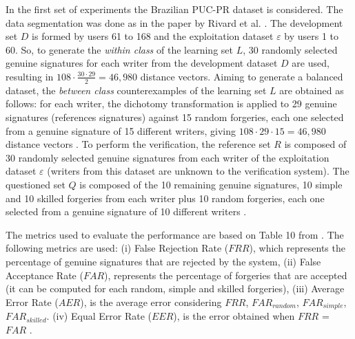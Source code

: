 \documentclass[conference]{IEEEtran}
\begin{document}
In the first set of experiments the Brazilian PUC-PR dataset is considered. The data segmentation was done as in the paper by Rivard et al. \cite{rivard:13}. The development set $D$ is formed by users 61 to 168 and the exploitation dataset $\varepsilon$ by users 1 to 60.
So, to generate the \textit{within class} of the learning set $L$, 30 randomly selected genuine signatures for each writer from the development dataset $D$ are used, resulting in $108 \cdot \frac{30 \cdot 29}{2} = 46,980$ distance vectors. Aiming to generate a balanced dataset, the \textit{between class} counterexamples of the learning set $L$ are obtained as follows: for each writer, the dichotomy transformation is applied to 29 genuine signatures (references signatures) against 15 random forgeries, each one selected from a genuine signature of 15 different writers, giving $ 108 \cdot 29 \cdot 15 = 46,980$ distance vectors \cite{rivard:13}. 
To perform the verification, the reference set $R$ is composed of 30 randomly selected genuine signatures from each writer of the exploitation dataset $\varepsilon$ (writers from this dataset are unknown to the verification system). The questioned set $Q$ is composed of the 10 remaining genuine signatures, 10 simple and 10 skilled forgeries from each writer plus 10 random forgeries, each one selected from a genuine signature of 10 different writers \cite{rivard:13}.


The metrics used to evaluate the performance are based on Table 10 from \cite{hafemann:17}. 
The following metrics are used: (i) False Rejection Rate ($FRR$), which represents the percentage of genuine signatures that are rejected by the system, (ii) False Acceptance Rate ($FAR$), represents the percentage of forgeries that are accepted (it can be computed for each random, simple and skilled forgeries), (iii) Average Error Rate ($AER$), is the average error considering $FRR$, $FAR_{random}$, $FAR_{simple}$, $FAR_{skilled}$.  (iv) Equal Error Rate ($EER$), is the error obtained when $FRR$ = $FAR$ \cite{hafemann_review:17}.
\end{document}
